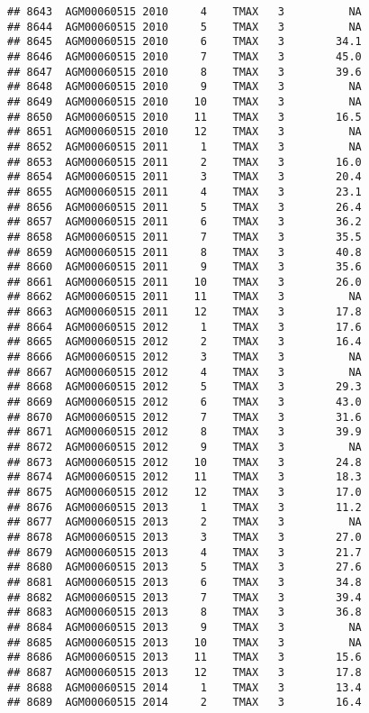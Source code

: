 \documentclass{article}\usepackage[]{graphicx}\usepackage[]{color}
\makeatletter
\newenvironment{kframe}{%
 \def\at@end@of@kframe{}%
 \ifinner\ifhmode%
  \def\at@end@of@kframe{\end{minipage}}%
  \begin{minipage}{\columnwidth}%
 \fi\fi%
 \def\FrameCommand##1{\hskip\@totalleftmargin \hskip-\fboxsep
 \colorbox{shadecolor}{##1}\hskip-\fboxsep
     \hskip-\linewidth \hskip-\@totalleftmargin \hskip\columnwidth}%
 \MakeFramed {\advance\hsize-\width
   \@totalleftmargin\z@ \linewidth\hsize
   \@setminipage}}%
 {\par\unskip\endMakeFramed%
 \at@end@of@kframe}
\newenvironment{knitrout}{}{} %
\makeatother
\begin{document}
\begin{knitrout}
\begin{kframe}
\begin{verbatim}
## 8643  AGM00060515 2010     4    TMAX   3          NA
## 8644  AGM00060515 2010     5    TMAX   3          NA
## 8645  AGM00060515 2010     6    TMAX   3        34.1
## 8646  AGM00060515 2010     7    TMAX   3        45.0
## 8647  AGM00060515 2010     8    TMAX   3        39.6
## 8648  AGM00060515 2010     9    TMAX   3          NA
## 8649  AGM00060515 2010    10    TMAX   3          NA
## 8650  AGM00060515 2010    11    TMAX   3        16.5
## 8651  AGM00060515 2010    12    TMAX   3          NA
## 8652  AGM00060515 2011     1    TMAX   3          NA
## 8653  AGM00060515 2011     2    TMAX   3        16.0
## 8654  AGM00060515 2011     3    TMAX   3        20.4
## 8655  AGM00060515 2011     4    TMAX   3        23.1
## 8656  AGM00060515 2011     5    TMAX   3        26.4
## 8657  AGM00060515 2011     6    TMAX   3        36.2
## 8658  AGM00060515 2011     7    TMAX   3        35.5
## 8659  AGM00060515 2011     8    TMAX   3        40.8
## 8660  AGM00060515 2011     9    TMAX   3        35.6
## 8661  AGM00060515 2011    10    TMAX   3        26.0
## 8662  AGM00060515 2011    11    TMAX   3          NA
## 8663  AGM00060515 2011    12    TMAX   3        17.8
## 8664  AGM00060515 2012     1    TMAX   3        17.6
## 8665  AGM00060515 2012     2    TMAX   3        16.4
## 8666  AGM00060515 2012     3    TMAX   3          NA
## 8667  AGM00060515 2012     4    TMAX   3          NA
## 8668  AGM00060515 2012     5    TMAX   3        29.3
## 8669  AGM00060515 2012     6    TMAX   3        43.0
## 8670  AGM00060515 2012     7    TMAX   3        31.6
## 8671  AGM00060515 2012     8    TMAX   3        39.9
## 8672  AGM00060515 2012     9    TMAX   3          NA
## 8673  AGM00060515 2012    10    TMAX   3        24.8
## 8674  AGM00060515 2012    11    TMAX   3        18.3
## 8675  AGM00060515 2012    12    TMAX   3        17.0
## 8676  AGM00060515 2013     1    TMAX   3        11.2
## 8677  AGM00060515 2013     2    TMAX   3          NA
## 8678  AGM00060515 2013     3    TMAX   3        27.0
## 8679  AGM00060515 2013     4    TMAX   3        21.7
## 8680  AGM00060515 2013     5    TMAX   3        27.6
## 8681  AGM00060515 2013     6    TMAX   3        34.8
## 8682  AGM00060515 2013     7    TMAX   3        39.4
## 8683  AGM00060515 2013     8    TMAX   3        36.8
## 8684  AGM00060515 2013     9    TMAX   3          NA
## 8685  AGM00060515 2013    10    TMAX   3          NA
## 8686  AGM00060515 2013    11    TMAX   3        15.6
## 8687  AGM00060515 2013    12    TMAX   3        17.8
## 8688  AGM00060515 2014     1    TMAX   3        13.4
## 8689  AGM00060515 2014     2    TMAX   3        16.4

\end{verbatim}
\end{kframe}
\end{knitrout}
\end{document}
